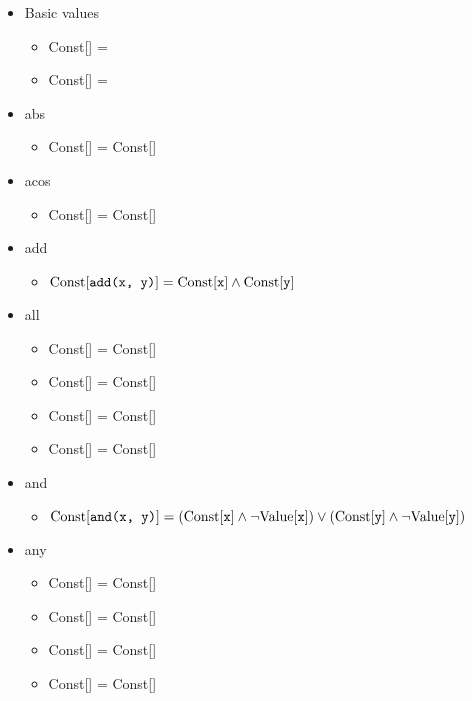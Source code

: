 \documentclass{article}
\begin{document}
\begin{itemize} \item Basic values \begin{itemize}

\item Const[] = \true
\item Const[] = \true

\end{itemize}\item abs \begin{itemize}
\item Const[] = Const[]

\end{itemize}\item acos \begin{itemize}
\item Const[] = Const[]

\end{itemize}\item add \begin{itemize}
\item $\textrm{Const}[\texttt{add(x, y)}] = \textrm{Const}[\texttt{x}] \land \textrm{Const}[\texttt{y}]$

\end{itemize}\item all \begin{itemize}
\item Const[] = Const[]
\item Const[] = Const[]
\item Const[] = Const[]
\item Const[] = Const[]

\end{itemize}\item and \begin{itemize}
\item $\textrm{Const}[\texttt{and(x, y)}] = (\textrm{Const}[\texttt{x}] \land \lnot \textrm{Value}[\texttt{x}]) \lor (\textrm{Const}[\texttt{y}] \land \lnot \textrm{Value}[\texttt{y}])$

\end{itemize}\item any \begin{itemize}
\item Const[] = Const[]
\item Const[] = Const[]
\item Const[] = Const[]
\item Const[] = Const[]


\end{itemize}
\end{itemize}
\end{document}
